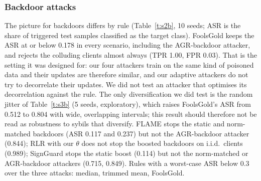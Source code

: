 \documentclass[conference]{IEEEtran}
\begin{document}
\subsubsection{Backdoor attacks}
The picture for backdoors differs by rule (Table~\ref{t:s2b}, 10 seeds; ASR is the share of triggered test samples classified as the target class). FoolsGold keeps the ASR at or below 0.178 in every scenario, including the AGR-backdoor attacker, and rejects the colluding clients almost always (TPR 1.00, FPR 0.03). That is the setting it was designed for: our four attackers train on the same kind of poisoned data and their updates are therefore similar, and our adaptive attackers do not try to decorrelate their updates. We did not test an attacker that optimises its decorrelation against the rule. The only diversification we did test is the random jitter of Table~\ref{t:s3b} (5 seeds, exploratory), which raises FoolsGold's ASR from 0.512 to 0.804 with wide, overlapping intervals; this result should therefore not be read as robustness to sybils that diversify. FLAME stops the static and norm-matched backdoors (ASR 0.117 and 0.237) but not the AGR-backdoor attacker (0.844); RLR with our $\theta$ does not stop the boosted backdoors on i.i.d.\ clients (0.989); SignGuard stops the static boost (0.114) but not the norm-matched or AGR-backdoor attackers (0.715, 0.849). Rules with a worst-case ASR below 0.3 over the three attacks: median, trimmed mean, FoolsGold.
\end{document}

